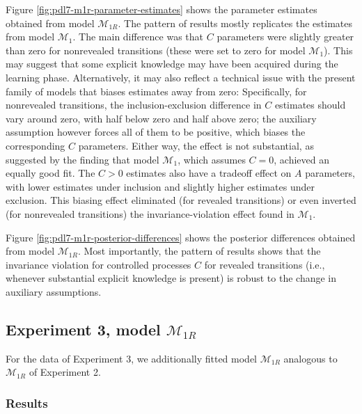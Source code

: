 \documentclass[english,,man]{apa6}
\begin{document}
\begin{appendix}
Figure \ref{fig:pdl7-m1r-parameter-estimates} shows the parameter
estimates obtained from model \(\mathcal{M}_{1R}\). The pattern of
results mostly replicates the estimates from model \(\mathcal{M}_1\).
The main difference was that \(C\) parameters were slightly greater than
zero for nonrevealed transitions (these were set to zero for model
\(\mathcal{M}_1\)). This may suggest that some explicit knowledge may
have been acquired during the learning phase. Alternatively, it may also
reflect a technical issue with the present family of models that biases
estimates away from zero: Specifically, for nonrevealed transitions, the
inclusion-exclusion difference in \(C\) estimates should vary around
zero, with half below zero and half above zero; the auxiliary assumption
however forces all of them to be positive, which biases the
corresponding \(C\) parameters. Either way, the effect is not
substantial, as suggested by the finding that model \(\mathcal{M}_1\),
which assumes \(C=0\), achieved an equally good fit. The \(C>0\)
estimates also have a tradeoff effect on \(A\) parameters, with lower
estimates under inclusion and slightly higher estimates under exclusion.
This biasing effect eliminated (for revealed transitions) or even
inverted (for nonrevealed transitions) the invariance-violation effect
found in \(\mathcal{M}_1\).

Figure \ref{fig:pdl7-m1r-posterior-differences} shows the posterior
differences obtained from model \(\mathcal{M}_{1R}\). Most importantly,
the pattern of results shows that the invariance violation for
controlled processes \(C\) for revealed transitions (i.e., whenever
substantial explicit knowledge is present) is robust to the change in
auxiliary assumptions.

\hypertarget{experiment-3-model-mathcalm_1r}{%
\subsection{\texorpdfstring{Experiment 3, model
\(\mathcal{M}_{1R}\)}{Experiment 3, model \textbackslash{}mathcal\{M\}\_\{1R\}}}\label{experiment-3-model-mathcalm_1r}}

For the data of Experiment 3, we additionally fitted model
\(\mathcal{M}_{1R}\) analogous to \(\mathcal{M}_{1R}\) of Experiment 2.

\hypertarget{results-2}{%
\subsubsection{Results}\label{results-2}}


\end{appendix}
\end{document}
